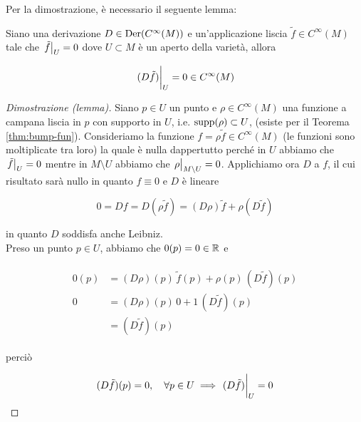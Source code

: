 Per la dimostrazione, è necessario il seguente lemma:

\begin{lemma}
	Siano una derivazione $ D \in \operatorname{Der}(C^{\infty}(M)) $ e un'applicazione liscia $ \tilde{f} \in C^{\infty}(M) $ tale che $ \eval{\tilde{f}}_{U} = 0 $ dove $ U \subset M $ è un aperto della varietà, allora
	
	\begin{equation}
		\eval{(D \tilde{f})}_{U} = 0 \in C^{\infty}(M)
	\end{equation}
\end{lemma}

\begin{proof}[Dimostrazione (lemma)]
	Siano $ p \in U $ un punto e $ \rho \in C^{\infty}(M) $ una funzione a campana liscia in $ p $ con supporto in $ U $, i.e. $ \operatorname{supp}(\rho) \subset U $, (esiste per il Teorema \ref{thm:bump-fun}). Consideriamo la funzione $ f = \rho \tilde{f} \in C^{\infty}(M) $ (le funzioni sono moltiplicate tra loro) la quale è nulla dappertutto perché in $ U $ abbiamo che $ \eval{\tilde{f}}_{U} = 0 $ mentre in $ M \setminus U $ abbiamo che $ \eval{\rho}_{M \setminus U} = 0 $. Applichiamo ora $ D $ a $ f $, il cui risultato sarà nullo in quanto $ f \equiv 0 $ e $ D $ è lineare
	
	\begin{equation}
		0 = D f %
		= D (\rho \tilde{f}) %
		= (D \rho) \tilde{f} + \rho (D \tilde{f})
	\end{equation}

	in quanto $ D $ soddisfa anche Leibniz. \\
	Preso un punto $ p \in U $, abbiamo che $ 0(p) = 0 \in \mathbb{R} $ e
	
	\begin{align}
		\begin{split}
			0(p) &= (D \rho)(p) \, \tilde{f}(p) + \rho(p) \, (D \tilde{f})(p) \\
			0 &= (D \rho)(p) \, 0 + 1 \, (D \tilde{f})(p) \\
			&= (D \tilde{f})(p)
		\end{split}
	\end{align}

	perciò
	
	\begin{equation}
		(D \tilde{f})(p) = 0 \qcomma \forall p \in U %
		\implies %
		\eval{(D \tilde{f})}_{U} = 0
	\end{equation}
\end{proof}

